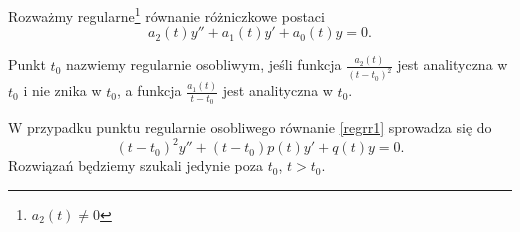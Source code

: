 %
Rozważmy regularne\footnote{$a_2(t) \not= 0$} równanie różniczkowe postaci
%
\begin{equation} \label{regrr1}
  a_2(t) y'' + a_1(t) y' + a_0(t) y = 0.
\end{equation}
%
\begin{definition}
  Punkt $t_0$ nazwiemy regularnie osobliwym, jeśli funkcja $\frac{a_2(t)}{(t-t_0)^2}$ jest analityczna w $t_0$ 
  i nie znika w $t_0$, a funkcja $\frac{a_1(t)}{t-t_0}$ jest analityczna w $t_0$.
\end{definition}
%
W przypadku punktu regularnie osobliwego równanie \eqref{regrr1} sprowadza się do
%
\begin{equation} \label{regrr2}
  (t-t_0)^2 y'' + (t-t_0) p(t) y' + q(t) y = 0.
\end{equation}
%
Rozwiązań będziemy szukali jedynie poza $t_0$, $t > t_0$.
%
